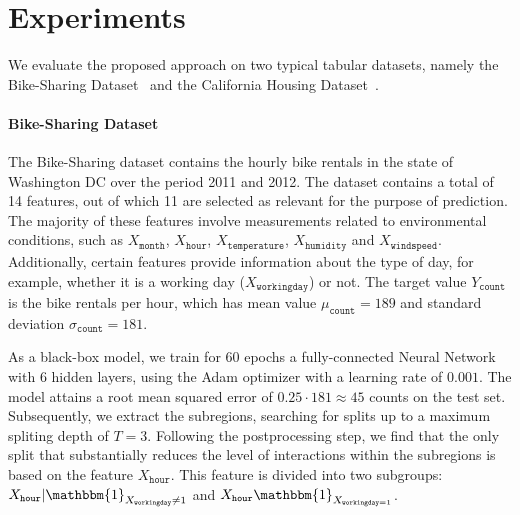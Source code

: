 \documentclass[12pt]{article}
\newcommand{\when}[1]{\mathbbm{1}_{#1}}
\begin{document}
\section{Experiments}

We evaluate the proposed approach on two typical tabular datasets, namely the Bike-Sharing Dataset~\citep{misc_bike_sharing_dataset_275}
and the California Housing Dataset~\citep{pace1997sparse}.

\paragraph{Bike-Sharing Dataset}

The Bike-Sharing dataset contains the hourly bike rentals in the state of Washington DC over the period 2011 and 2012.
The dataset contains a total of 14 features, out of which 11 are selected as relevant for the purpose of prediction.
The majority of these features involve measurements related to environmental conditions,
such as $X_{\mathtt{month}}$, $X_{\mathtt{hour}}$, $X_{\mathtt{temperature}}$, $X_{\mathtt{humidity}}$ and $X_{\mathtt{windspeed}}$.
Additionally, certain features provide information about the type of day, for example, whether it is a working day ($X_{\mathtt{workingday}}$) or not.
The target value \( Y_{\mathtt{count}}\) is the bike rentals per hour, which has mean value
\(\mu_{\mathtt{count}} = 189\) and standard deviation \(\sigma_{\mathtt{count}} = 181\).

As a black-box model, we train for \(60\) epochs a fully-connected Neural Network with 6 hidden layers, using the Adam optimizer with a learning rate of $0.001$.
The model attains a root mean squared error of \( 0.25 \cdot 181 \approx 45\) counts on the test set.
Subsequently, we extract the subregions, searching for splits up to a maximum spliting depth of \(T=3\).
Following the postprocessing step, we find that the only split that substantially reduces the level of interactions within the subregions is based on the feature
$X_{\mathtt{hour}}$. This feature is divided into two subgroups: $X_{\mathtt{hour}} | \when{X_{\mathtt{workingday}} \neq 1}$ and $X_{\mathtt{hour}} \when{X_{\mathtt{workingday} = 1}}$.
\end{document}
